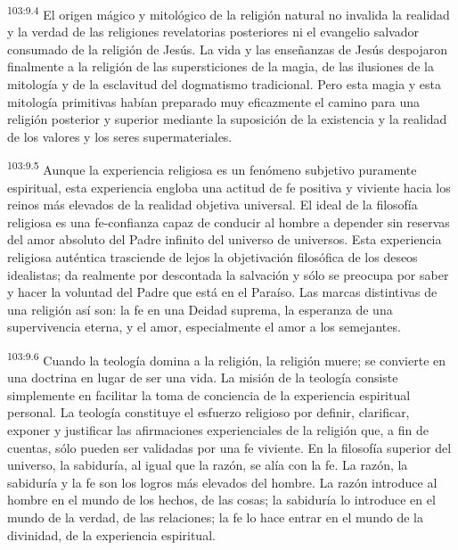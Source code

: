\par
\textsuperscript{103:9.4} El origen mágico y mitológico de la religión natural no invalida la realidad y la verdad de las religiones revelatorias posteriores ni el evangelio salvador consumado de la religión de Jesús. La vida y las enseñanzas de Jesús despojaron finalmente a la religión de las supersticiones de la magia, de las ilusiones de la mitología y de la esclavitud del dogmatismo tradicional. Pero esta magia y esta mitología primitivas habían preparado muy eficazmente el camino para una religión posterior y superior mediante la suposición de la existencia y la realidad de los valores y los seres supermateriales.

\par
\textsuperscript{103:9.5} Aunque la experiencia religiosa es un fenómeno subjetivo puramente espiritual, esta experiencia engloba una actitud de fe positiva y viviente hacia los reinos más elevados de la realidad objetiva universal. El ideal de la filosofía religiosa es una fe-confianza capaz de conducir al hombre a depender sin reservas del amor absoluto del Padre infinito del universo de universos. Esta experiencia religiosa auténtica trasciende de lejos la objetivación filosófica de los deseos idealistas; da realmente por descontada la salvación y sólo se preocupa por saber y hacer la voluntad del Padre que está en el Paraíso. Las marcas distintivas de una religión así son: la fe en una Deidad suprema, la esperanza de una supervivencia eterna, y el amor, especialmente el amor a los semejantes.

\par
\textsuperscript{103:9.6} Cuando la teología domina a la religión, la religión muere; se convierte en una doctrina en lugar de ser una vida. La misión de la teología consiste simplemente en facilitar la toma de conciencia de la experiencia espiritual personal. La teología constituye el esfuerzo religioso por definir, clarificar, exponer y justificar las afirmaciones experienciales de la religión que, a fin de cuentas, sólo pueden ser validadas por una fe viviente. En la filosofía superior del universo, la sabiduría, al igual que la razón, se alía con la fe. La razón, la sabiduría y la fe son los logros más elevados del hombre. La razón introduce al hombre en el mundo de los hechos, de las cosas; la sabiduría lo introduce en el mundo de la verdad, de las relaciones; la fe lo hace entrar en el mundo de la divinidad, de la experiencia espiritual.

